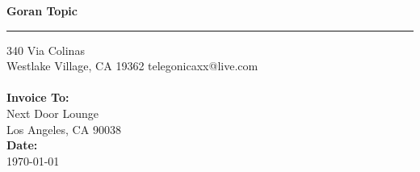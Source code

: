 \documentclass{invoice}
\def \tab {\hspace*{3ex}}
\begin{document}
\hfil{\Huge\bf Goran Topic}\hfil
\bigskip\break
\hrule
340 Via Colinas \hfill  \\ 
Westlake Village, CA 19362 \hfill telegonicaxx@live.com
\\ \\
{\bf Invoice To:} \\
\tab Next Door Lounge \\ 
\tab Los Angeles, CA 90038 \\ 
{\bf Date:} \\
\tab \today \\
\begin{invoiceTable}
\end{invoiceTable}
\end{document}

